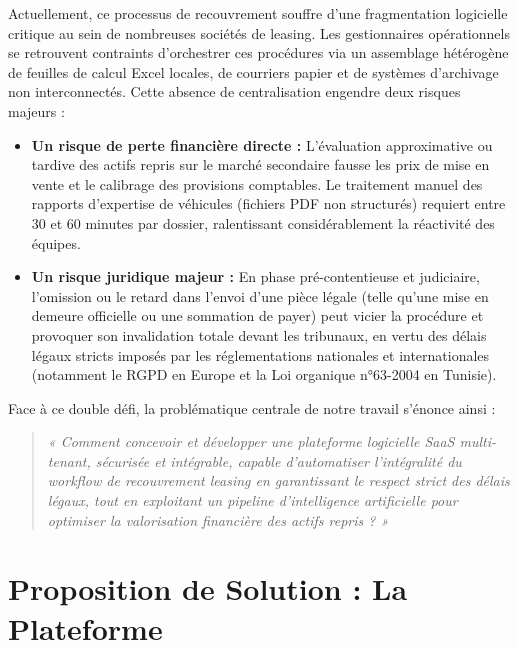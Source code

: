 Actuellement, ce processus de recouvrement souffre d'une fragmentation logicielle critique au sein de nombreuses sociétés de leasing. Les gestionnaires opérationnels se retrouvent contraints d'orchestrer ces procédures via un assemblage hétérogène de feuilles de calcul Excel locales, de courriers papier et de systèmes d'archivage non interconnectés. Cette absence de centralisation engendre deux risques majeurs :
\begin{itemize}
    \item \textbf{Un risque de perte financière directe :} L'évaluation approximative ou tardive des actifs repris sur le marché secondaire fausse les prix de mise en vente et le calibrage des provisions comptables. Le traitement manuel des rapports d'expertise de véhicules (fichiers PDF non structurés) requiert entre 30 et 60 minutes par dossier, ralentissant considérablement la réactivité des équipes.
    \item \textbf{Un risque juridique majeur :} En phase pré-contentieuse et judiciaire, l'omission ou le retard dans l'envoi d'une pièce légale (telle qu'une mise en demeure officielle ou une sommation de payer) peut vicier la procédure et provoquer son invalidation totale devant les tribunaux, en vertu des délais légaux stricts imposés par les réglementations nationales et internationales (notamment le RGPD en Europe et la Loi organique n°63-2004 en Tunisie).
\end{itemize}

Face à ce double défi, la problématique centrale de notre travail s'énonce ainsi :

\begin{quote}
\textit{« Comment concevoir et développer une plateforme logicielle SaaS multi-tenant, sécurisée et intégrable, capable d'automatiser l'intégralité du workflow de recouvrement leasing en garantissant le respect strict des délais légaux, tout en exploitant un pipeline d'intelligence artificielle pour optimiser la valorisation financière des actifs repris ? »}
\end{quote}

\section*{Proposition de Solution : La Plateforme \projectShortTitle}

